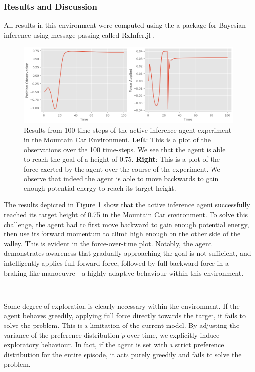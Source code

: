 \documentclass{article}
\begin{document}
\subsubsection{Results and Discussion}

All results in this environment were computed using the a package for Bayesian inference using message passing called RxInfer.jl \citep{bagaev2023rxinfer}. 

\begin{figure}[htbp]
    \centering
    \includegraphics[scale=0.55]{images/mountain_car_results.png}
    \caption{Results from 100 time steps of the active inference agent experiment in the Mountain Car Environment. \textbf{Left}: This is a plot of the observations over the 100 time-steps. We see that the agent is able to reach the goal of a height of 0.75. \textbf{Right}: This is a plot of the force exerted by the agent over the course of the experiment. We observe that indeed the agent is able to move backwards to gain enough potential energy to reach its target height. }
    \label{fig:mountain_car_results}
\end{figure}

The results depicted in Figure \ref{fig:mountain_car_results} show that the active inference agent successfully reached its target height of 0.75 in the Mountain Car environment. To solve this challenge, the agent had to first move backward to gain enough potential energy, then use its forward momentum to climb high enough on the other side of the valley. This is evident in the force-over-time plot. Notably, the agent demonstrates awareness that gradually approaching the goal is not sufficient, and intelligently applies full forward force, followed by full backward force in a braking-like manoeuvre—a highly adaptive behaviour within this environment.

\

Some degree of exploration is clearly necessary within the environment. If the agent behaves greedily, applying full force directly towards the target, it fails to solve the problem. This is a limitation of the current model. By adjusting the variance of the preference distribution $\tilde{p}$ over time, we explicitly induce exploratory behaviour. In fact, if the agent is set with a strict preference distribution for the entire episode, it acts purely greedily and fails to solve the problem.
\end{document}
